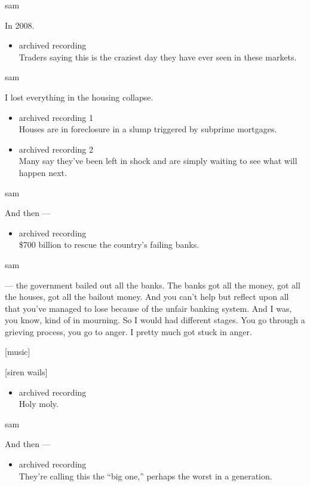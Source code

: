 sam

In 2008.

\begin{itemize}
\tightlist
\item
  archived recording\\
  Traders saying this is the craziest day they have ever seen in these
  markets.
\end{itemize}

sam

I lost everything in the housing collapse.

\begin{itemize}
\item
  archived recording 1\\
  Houses are in foreclosure in a slump triggered by subprime mortgages.
\item
  archived recording 2\\
  Many say they've been left in shock and are simply waiting to see what
  will happen next.
\end{itemize}

sam

And then ---

\begin{itemize}
\tightlist
\item
  archived recording\\
  \$700 billion to rescue the country's failing banks.
\end{itemize}

sam

--- the government bailed out all the banks. The banks got all the
money, got all the houses, got all the bailout money. And you can't help
but reflect upon all that you've managed to lose because of the unfair
banking system. And I was, you know, kind of in mourning. So I would had
different stages. You go through a grieving process, you go to anger. I
pretty much got stuck in anger.

{[}music{]}

{[}siren wails{]}

\begin{itemize}
\tightlist
\item
  archived recording\\
  Holy moly.
\end{itemize}

sam

And then ---

\begin{itemize}
\tightlist
\item
  archived recording\\
  They're calling this the ``big one,'' perhaps the worst in a
  generation.
\end{itemize}

